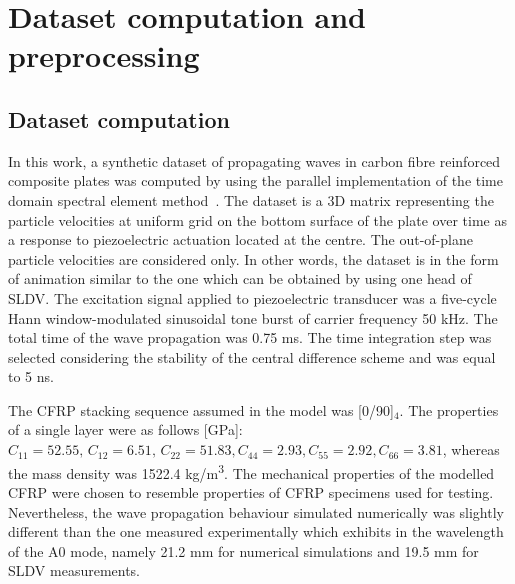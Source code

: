 \section{Dataset computation and preprocessing}
\subsection{Dataset computation}
In this work, a synthetic dataset of propagating waves in carbon fibre reinforced composite plates was computed by using the parallel implementation of the time domain spectral element method~\cite{Kudela2020}. 
The dataset is a 3D matrix representing the particle velocities at uniform grid on the bottom surface of the plate over time as a response to piezoelectric actuation located at the centre.
The out-of-plane particle velocities are considered only.
In other words, the dataset is in the form of animation similar to the one which can be obtained by using one head of SLDV.
The excitation signal applied to piezoelectric transducer was a five-cycle Hann window-modulated sinusoidal tone burst of carrier frequency 50 kHz. 
The total time of the wave propagation was 0.75 ms.
The time integration step was selected considering the stability of the central difference scheme and was equal to 5 ns.

The CFRP stacking sequence assumed in the model was [0/90]\(_4\). 
The properties of a single layer were as follows [GPa]:
\(C_{11} = 52.55, \, C_{12} = 6.51, \, C_{22} = 51.83, C_{44} = 2.93, C_{55} = 
2.92, C_{66} = 3.81\),
whereas the mass density was 1522.4 kg/m\textsuperscript{3}.
The mechanical properties of the modelled CFRP were chosen to resemble properties of CFRP specimens used for testing.
Nevertheless, the wave propagation behaviour simulated numerically was slightly different than the one measured experimentally which exhibits in the wavelength of the A0 mode, namely 21.2 mm for numerical simulations and 19.5 mm for SLDV measurements.

